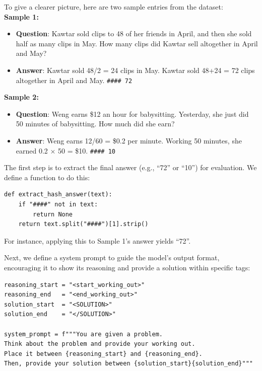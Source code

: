 \documentclass{article}
\begin{document}
\vspace{0.5em}
\noindent To give a clearer picture, here are two sample entries from the dataset:\\
\textbf{Sample 1:}
\begin{itemize}
    \item \textbf{Question}: Kawtar sold clips to 48 of her friends in April, and then she sold half as many clips in May. How many clips did Kawtar sell altogether in April and May?
    \item \textbf{Answer}: Kawtar sold 48/2 = 24 clips in May. Kawtar sold 48+24 = 72 clips altogether in April and May. \texttt{\#\#\#\# 72}
\end{itemize}
\textbf{Sample 2:}
\begin{itemize}
\item \textbf{Question}: Weng earns \$12 an hour for babysitting. Yesterday, she just did 50 minutes of babysitting. How much did she earn?
\item \textbf{Answer}: Weng earns 12/60 = \$0.2 per minute. Working 50 minutes, she earned 0.2 $\times$ 50 = \$10. \texttt{\#\#\#\# 10}
\end{itemize}
\vspace{0.5em}


\vspace{0.5em}
The first step is to extract the final answer (e.g., ``72'' or ``10'') for evaluation. We define a function to do this:

\begin{verbatim}
def extract_hash_answer(text):
    if "####" not in text:
        return None
    return text.split("####")[1].strip()
\end{verbatim}

For instance, applying this to Sample 1’s answer yields ``72''. 

\vspace{0.5em}
Next, we define a system prompt to guide the model’s output format, encouraging it to show its reasoning and provide a solution within specific tags:

\begin{verbatim}
reasoning_start = "<start_working_out>"
reasoning_end   = "<end_working_out>"
solution_start  = "<SOLUTION>"
solution_end    = "</SOLUTION>"

system_prompt = f"""You are given a problem.
Think about the problem and provide your working out.
Place it between {reasoning_start} and {reasoning_end}.
Then, provide your solution between {solution_start}{solution_end}"""
\end{verbatim}
\end{document}
